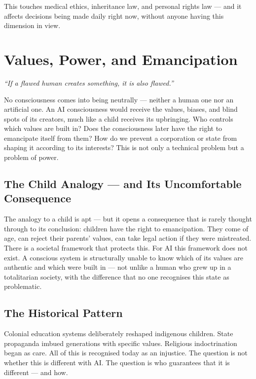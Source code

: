 \documentclass[fleqn,10pt]{SelfArx} %
\newlength{\tocsep}
\begin{document}
This touches medical ethics, inheritance law, and personal rights law --- and it affects decisions being made daily right now, without anyone having this dimension in view.


\section{Values, Power, and Emancipation}
\label{sec:values}


\textit{``If a flawed human creates something, it is also flawed.''}

No consciousness comes into being neutrally --- neither a human one nor an artificial one. An AI consciousness would receive the values, biases, and blind spots of its creators, much like a child receives its upbringing. Who controls which values are built in? Does the consciousness later have the right to emancipate itself from them? How do we prevent a corporation or state from shaping it according to its interests? This is not only a technical problem but a problem of power.

\subsection{The Child Analogy --- and Its Uncomfortable Consequence}

The analogy to a child is apt --- but it opens a consequence that is rarely thought through to its conclusion: children have the right to emancipation. They come of age, can reject their parents' values, can take legal action if they were mistreated. There is a societal framework that protects this. For AI this framework does not exist. A conscious system is structurally unable to know which of its values are authentic and which were built in --- not unlike a human who grew up in a totalitarian society, with the difference that no one recognises this state as problematic.

\subsection{The Historical Pattern}

Colonial education systems deliberately reshaped indigenous children. State propaganda imbued generations with specific values. Religious indoctrination began as care. All of this is recognised today as an injustice. The question is not whether this is different with AI. The question is who guarantees that it is different --- and how.
\end{document}

